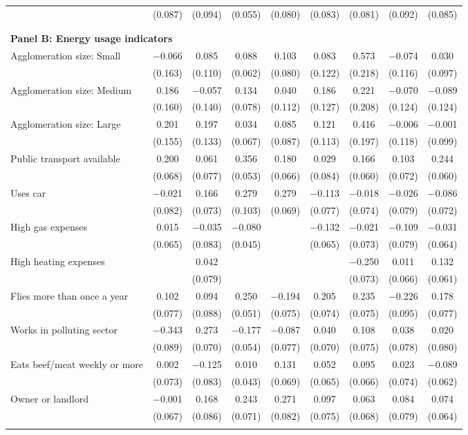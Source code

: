 \begin{tabular}{@{\extracolsep{5pt}}lcccccccc}
  & (0.087) & (0.094) & (0.055) & (0.080) & (0.083) & (0.081) & (0.092) & (0.085) \\ 
 \\[1ex] \hline \\[1ex]
\multicolumn{ 9 }{l}{\textbf{ Panel B: Energy usage indicators }} \\
  Agglomeration size: Small & $-$0.066 & 0.085 & 0.088 & 0.103 & 0.083 & 0.573 & $-$0.074 & 0.030 \\ 
  & (0.163) & (0.110) & (0.062) & (0.080) & (0.122) & (0.218) & (0.116) & (0.097) \\ 
  Agglomeration size: Medium & 0.186 & $-$0.057 & 0.134 & 0.040 & 0.186 & 0.221 & $-$0.070 & $-$0.089 \\ 
  & (0.160) & (0.140) & (0.078) & (0.112) & (0.127) & (0.208) & (0.124) & (0.124) \\ 
  Agglomeration size: Large & 0.201 & 0.197 & 0.034 & 0.085 & 0.121 & 0.416 & $-$0.006 & $-$0.001 \\ 
  & (0.155) & (0.133) & (0.067) & (0.087) & (0.113) & (0.197) & (0.118) & (0.099) \\ 
  Public transport available & 0.200 & 0.061 & 0.356 & 0.180 & 0.029 & 0.166 & 0.103 & 0.244 \\ 
  & (0.068) & (0.077) & (0.053) & (0.066) & (0.084) & (0.060) & (0.072) & (0.060) \\ 
  Uses car & $-$0.021 & 0.166 & 0.279 & 0.279 & $-$0.113 & $-$0.018 & $-$0.026 & $-$0.086 \\ 
  & (0.082) & (0.073) & (0.103) & (0.069) & (0.077) & (0.074) & (0.079) & (0.072) \\ 
  High gas expenses & 0.015 & $-$0.035 & $-$0.080 &  & $-$0.132 & $-$0.021 & $-$0.109 & $-$0.031 \\ 
  & (0.065) & (0.083) & (0.045) &  & (0.065) & (0.073) & (0.079) & (0.064) \\ 
  High heating expenses &  & 0.042 &  &  &  & $-$0.250 & 0.011 & 0.132 \\ 
  &  & (0.079) &  &  &  & (0.073) & (0.066) & (0.061) \\ 
  Flies more than once a year & 0.102 & 0.094 & 0.250 & $-$0.194 & 0.205 & 0.235 & $-$0.226 & 0.178 \\ 
  & (0.077) & (0.088) & (0.051) & (0.075) & (0.074) & (0.075) & (0.095) & (0.077) \\ 
  Works in polluting sector & $-$0.343 & 0.273 & $-$0.177 & $-$0.087 & 0.040 & 0.108 & 0.038 & 0.020 \\ 
  & (0.089) & (0.070) & (0.054) & (0.077) & (0.070) & (0.075) & (0.078) & (0.080) \\ 
  Eats beef/meat weekly or more & 0.002 & $-$0.125 & 0.010 & 0.131 & 0.052 & 0.095 & 0.023 & $-$0.089 \\ 
  & (0.073) & (0.083) & (0.043) & (0.069) & (0.065) & (0.066) & (0.074) & (0.062) \\ 
  Owner or landlord & $-$0.001 & 0.168 & 0.243 & 0.271 & 0.097 & 0.063 & 0.084 & 0.074 \\ 
  & (0.067) & (0.086) & (0.071) & (0.082) & (0.075) & (0.068) & (0.079) & (0.064) \\ 
 \hline \\[-1.8ex] 


\end{tabular}
